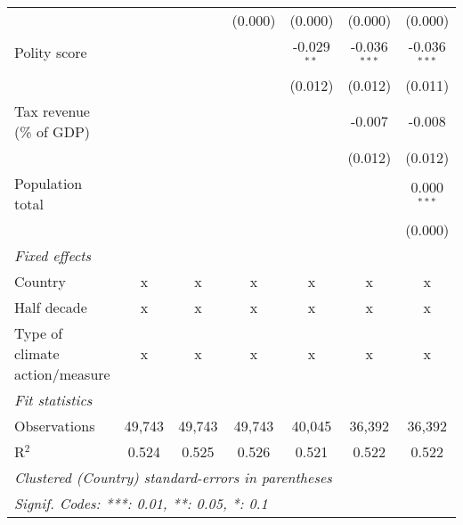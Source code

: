 \begin{tabular}{lcccccc}
                                                                                &               &                & (0.000)        & (0.000)        & (0.000)        & (0.000)\\   
   Polity score                                                                 &               &                &                & -0.029$^{**}$  & -0.036$^{***}$ & -0.036$^{***}$\\   
                                                                                &               &                &                & (0.012)        & (0.012)        & (0.011)\\   
   Tax revenue (\% of GDP)                                                      &               &                &                &                & -0.007         & -0.008\\   
                                                                                &               &                &                &                & (0.012)        & (0.012)\\   
   Population total                                                             &               &                &                &                &                & 0.000$^{***}$\\   
                                                                                &               &                &                &                &                & (0.000)\\   
   \emph{Fixed effects}\\
   Country                                                                      & x             & x              & x              & x              & x              & x\\  
   Half decade                                                                  & x             & x              & x              & x              & x              & x\\  
   Type of climate action/measure                                               & x             & x              & x              & x              & x              & x\\  
   \midrule \emph{Fit statistics}\\
   Observations                                                                 & 49,743        & 49,743         & 49,743         & 40,045         & 36,392         & 36,392\\  
   R$^2$                                                                        & 0.524         & 0.525          & 0.526          & 0.521          & 0.522          & 0.522\\  
   \midrule
   \multicolumn{7}{l}{\emph{Clustered (Country) standard-errors in parentheses}}\\
   \multicolumn{7}{l}{\emph{Signif. Codes: ***: 0.01, **: 0.05, *: 0.1}}\\
\end{tabular}
\par\endgroup



